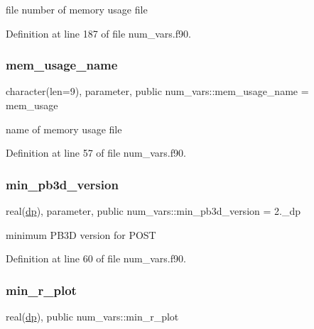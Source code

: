 file number of memory usage file 



Definition at line 187 of file num\+\_\+vars.\+f90.

\mbox{\label{namespacenum__vars_a88d78503df095a1c19b851caf2d889ba}} 
\subsubsection{\texorpdfstring{mem\+\_\+usage\+\_\+name}{mem\_usage\_name}}
{\footnotesize\ttfamily character(len=9), parameter, public num\+\_\+vars\+::mem\+\_\+usage\+\_\+name = \textquotesingle{}mem\+\_\+usage\textquotesingle{}}



name of memory usage file 



Definition at line 57 of file num\+\_\+vars.\+f90.

\mbox{\label{namespacenum__vars_a7188b02fe090f6e8891fdd26f604284f}} 
\subsubsection{\texorpdfstring{min\+\_\+pb3d\+\_\+version}{min\_pb3d\_version}}
{\footnotesize\ttfamily real(\hyperlink{namespacenum__vars_a03802aa2bd86439d7a9370836fabf3f2}{dp}), parameter, public num\+\_\+vars\+::min\+\_\+pb3d\+\_\+version = 2.\+\_\+dp}



minimum P\+B3D version for P\+O\+ST 



Definition at line 60 of file num\+\_\+vars.\+f90.

\mbox{\label{namespacenum__vars_ab3369f21aa4433cb6dc08957e477c015}} 
\subsubsection{\texorpdfstring{min\+\_\+r\+\_\+plot}{min\_r\_plot}}
{\footnotesize\ttfamily real(\hyperlink{namespacenum__vars_a03802aa2bd86439d7a9370836fabf3f2}{dp}), public num\+\_\+vars\+::min\+\_\+r\+\_\+plot}



